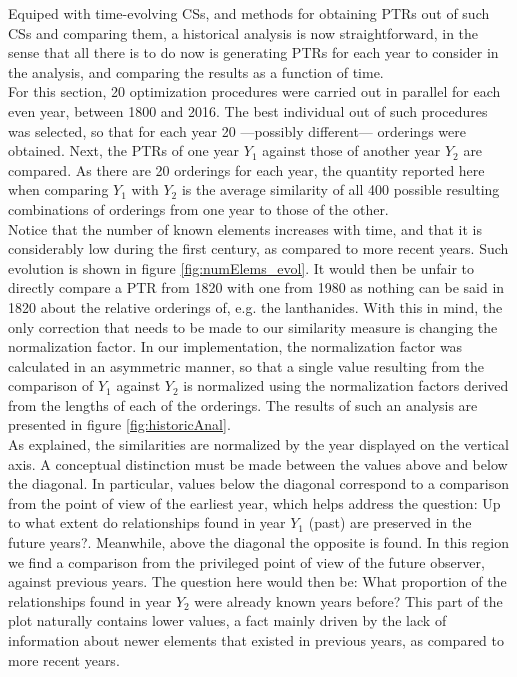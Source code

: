 \documentclass[article]{article}
\begin{document}
Equiped with time-evolving CSs, and methods for obtaining PTRs out of such CSs and comparing them, a historical analysis is now straightforward, in the sense that all there is to do now is generating PTRs for each year to consider in the analysis, and comparing the results as a function of time.\\

For this section, 20 optimization procedures were carried out in parallel for each even year, between 1800 and 2016. The best individual out of such procedures was selected, so that for each year 20 ---possibly different--- orderings were obtained. Next, the PTRs of one year $Y_1$ against those of another year $Y_2$ are compared. As there are 20 orderings for each year, the quantity reported here when comparing $Y_1$ with $Y_2$ is the average similarity of all 400 possible resulting combinations of orderings from one year to those of the other. \\

Notice that the number of known elements increases with time, and that it is considerably low during the first century, as compared to more recent years. Such evolution is shown in figure \ref{fig:numElems_evol}. It would then be unfair to directly compare a PTR from 1820 with one from 1980 as nothing can be said in 1820 about the relative orderings of, e.g. the lanthanides. With this in mind, the only correction that needs to be made to our similarity measure is changing the normalization factor. In our implementation, the normalization factor was calculated in an asymmetric manner, so that a single value resulting from the comparison of $Y_1$ against $Y_2$ is normalized using the normalization factors derived from the lengths of each of the orderings. The results of such an analysis are presented in figure \ref{fig:historicAnal}. \\

As explained, the similarities are normalized by the year displayed on the vertical axis. A conceptual distinction must be made between the values above and below the diagonal. In particular, values below the diagonal correspond to a comparison from the point of view of the earliest year, which helps address the question: Up to what extent do relationships found in year $Y_1$ (past) are preserved in the future years?. Meanwhile, above the diagonal the opposite is found. In this region we find a comparison from the privileged point of view of the future observer, against previous years. The question here would then be: What proportion of the relationships found in year $Y_2$ were already known years before? This part of the plot naturally contains lower values, a fact mainly driven by the lack of information about newer elements that existed in previous years, as compared to more recent years.\\
\end{document}

